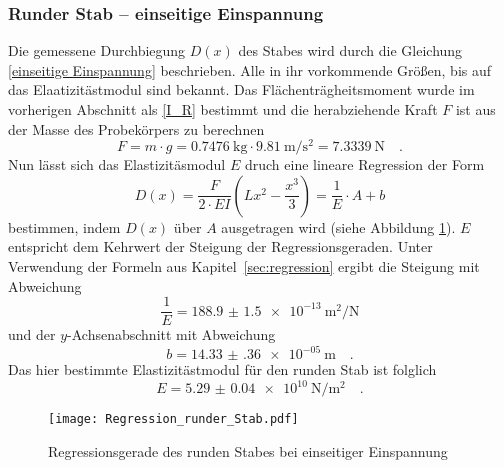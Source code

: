 \subsubsection{Runder Stab -- einseitige Einspannung}
Die gemessene Durchbiegung $D(x)$ des Stabes wird durch die Gleichung \eqref{einseitige Einspannung} beschrieben.
Alle in ihr vorkommende Größen, bis auf das Elaatizitästmodul sind bekannt. Das Flächenträgheitsmoment wurde im vorherigen Abschnitt als \eqref{I_R} bestimmt und die herabziehende Kraft $F$ ist aus der Masse des Probekörpers zu berechnen
\begin{equation}
  F = m \cdot g = \SI{0.7476}{\kilo\gram} \cdot \SI{9.81}{\metre\per\second\squared} = \SI{7.3339}{\newton} \quad .
\end{equation}
Nun lässt sich das Elastizitäsmodul $E$ druch eine lineare Regression der Form
\begin{equation}
  D(x) = \frac{F}{2\cdot E I}\left(Lx^2-\frac{x^3}{3}\right) = \frac{1}{E} \cdot A +b
\end{equation}
bestimmen, indem $D(x)$ über $A$ ausgetragen wird (siehe Abbildung \ref{fig:Regression_runder_Stab}). $E$ entspricht dem Kehrwert der Steigung der Regressionsgeraden. Unter Verwendung der Formeln aus Kapitel~\ref{sec:regression} ergibt die Steigung mit Abweichung
\begin{equation}
  \frac{1}{E}= \SI{188.9(15)e-13}{\metre\squared\per\newton}
\end{equation}
und der $y$-Achsenabschnitt mit Abweichung
\begin{equation}
  b = \SI{14.33(36)e-05}{\metre} \quad.
\end{equation}
Das hier bestimmte Elastizitästmodul für den runden Stab ist folglich
\begin{equation}
  E = \SI{5.29(4)e+10}{\newton\per\metre\squared} \quad.
\end{equation}

\begin{figure}
\centering
\texttt{[image: Regression\_runder\_Stab.pdf]}
\caption{Regressionsgerade des runden Stabes bei einseitiger Einspannung}
\label{fig:Regression_runder_Stab}
\end{figure}



